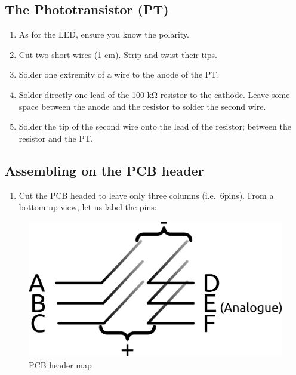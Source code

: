 \documentclass[]{article}
\begin{document}
\subsection{The Phototransistor (PT)}\label{the-phototransistor-pt}

\begin{enumerate}
\def\labelenumi{\arabic{enumi}.}
\itemsep1pt\parskip0pt
\item
  As for the LED, ensure you know the polarity.
\item
  Cut two short wires (1 cm). Strip and twist their tips.
\item
  Solder one extremity of a wire to the anode of the PT.
\item
  Solder directly one lead of the 100 kΩ resistor to the cathode. Leave
  some space between the anode and the resistor to solder the second
  wire.
\item
  Solder the tip of the second wire onto the lead of the resistor;
  between the resistor and the PT.
\end{enumerate}

\subsection{Assembling on the PCB
header}\label{assembling-on-the-pcb-header}

\begin{enumerate}
\def\labelenumi{\arabic{enumi}.}
\itemsep1pt\parskip0pt
\item
  Cut the PCB headed to leave only three columns (i.e.~6pins). From a
  bottom-up view, let us label the pins:
\end{enumerate}

\begin{figure}[htbp]
\centering
\includegraphics{./img/header_map.png}
\caption{PCB header map}
\end{figure}
\end{document}
